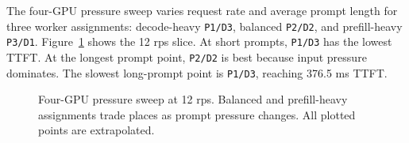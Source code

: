 The four-GPU pressure sweep varies request rate and average prompt length for
three worker assignments: decode-heavy \texttt{P1/D3}, balanced \texttt{P2/D2},
and prefill-heavy \texttt{P3/D1}. Figure~\ref{fig:pressure} shows the 12 rps
slice. At short prompts, \texttt{P1/D3} has the lowest TTFT.
At the longest prompt point, \texttt{P2/D2} is best because
input pressure dominates. The slowest long-prompt point is \texttt{P1/D3},
reaching 376.5 ms TTFT.

\begin{figure}[t]
\centering
{}
\caption{Four-GPU pressure sweep at 12 rps. Balanced and prefill-heavy
	assignments trade places as prompt pressure changes. All plotted points are
	extrapolated.}
\label{fig:pressure}
\end{figure}

